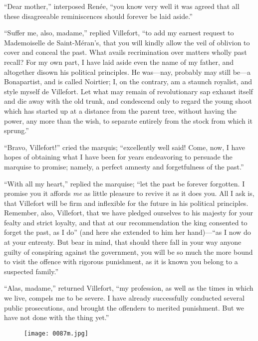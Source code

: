 “Dear mother,” interposed Renée, “you know very well it was agreed that
all these disagreeable reminiscences should forever be laid aside.”

“Suffer me, also, madame,” replied Villefort, “to add my earnest
request to Mademoiselle de Saint-Méran’s, that you will kindly allow
the veil of oblivion to cover and conceal the past. What avails
recrimination over matters wholly past recall? For my own part, I have
laid aside even the name of my father, and altogether disown his
political principles. He was—nay, probably may still be—a Bonapartist,
and is called Noirtier; I, on the contrary, am a staunch royalist, and
style myself de Villefort. Let what may remain of revolutionary sap
exhaust itself and die away with the old trunk, and condescend only to
regard the young shoot which has started up at a distance from the
parent tree, without having the power, any more than the wish, to
separate entirely from the stock from which it sprung.”

“Bravo, Villefort!” cried the marquis; “excellently well said! Come,
now, I have hopes of obtaining what I have been for years endeavoring
to persuade the marquise to promise; namely, a perfect amnesty and
forgetfulness of the past.”

“With all my heart,” replied the marquise; “let the past be forever
forgotten. I promise you it affords \textit{me} as little pleasure to revive
it as it does you. All I ask is, that Villefort will be firm and
inflexible for the future in his political principles. Remember, also,
Villefort, that we have pledged ourselves to his majesty for your
fealty and strict loyalty, and that at our recommendation the king
consented to forget the past, as I do” (and here she extended to him
her hand)—“as I now do at your entreaty. But bear in mind, that should
there fall in your way anyone guilty of conspiring against the
government, you will be so much the more bound to visit the offence
with rigorous punishment, as it is known you belong to a suspected
family.”

“Alas, madame,” returned Villefort, “my profession, as well as the
times in which we live, compels me to be severe. I have already
successfully conducted several public prosecutions, and brought the
offenders to merited punishment. But we have not done with the thing
yet.”

\begin{figure}[ht]
\texttt{[image: 0087m.jpg]}
\end{figure}

